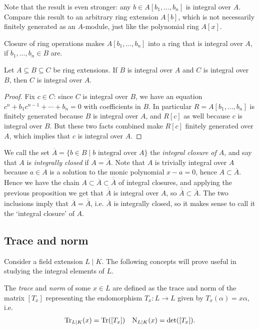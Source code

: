 Note that the result is even stronger: any $b\in A[b_1,\dots,b_n]$ is integral over $A$. Compare this result to an arbitrary ring extension $A[b]$, which is not necessarily finitely generated as an $A$-module, just like the polynomial ring $A[x]$.

Closure of ring operations makes $A[b_1,\dots,b_n]$ into a ring that is integral over $A$, if $b_1,\dots,b_n\in B$ are.

\begin{proposition}
	Let $A\subseteq B\subseteq C$ be ring extensions. If $B$ is integral over $A$ and $C$ is integral over $B$, then $C$ is integral over $A$.
\end{proposition}
\begin{proof}
	Fix $c\in C$: since $C$ is integral over $B$, we have an equation $c^n+b_1c^{n-1}+\cdots+b_n=0$ with coefficients in $B$. In particular $R=A[b_1,\dots,b_n]$ is finitely generated because $B$ is integral over $A$, and $R[c]$ as well because $c$ is integral over $B$. But these two facts combined make $R[c]$ finitely generated over $A$, which implies that $c$ is integral over $A$.
\end{proof}

We call the set $\overline{A}=\{b\in B \mid b \text{ integral over } A\}$ the \emph{integral closure of $A$}, and say that $A$ is \emph{integrally closed} if $A=\overline{A}$. Note that $A$ is trivially integral over $A$ because $a\in A$ is a solution to the monic polynomial $x-a=0$, hence $A\subset\overline{A}$. Hence we have the chain $A\subset \overline{A}\subset\overline{\overline{A}}$ of integral closures, and applying the previous proposition we get that $\overline{\overline{A}}$ is integral over $A$, so $\overline{\overline{A}}\subset\overline{A}$. The two inclusions imply that $\overline{A}=\overline{\overline{A}}$, i.e. $\overline{A}$ is integrally closed, so it makes sense to call it the `integral closure' of $A$.


\subsection{Trace and norm}

Consider a field extension $L\mid K$. The following concepts will prove useful in studying the integral elements of $L$.

\begin{definition}
	The \emph{trace} and \emph{norm} of some $x\in L$ are defined as the trace and norm of the matrix $[T_x]$ representing the endomorphism $T_x:L\to L$ given by $T_x(\alpha)=x\alpha$, i.e.
	\begin{align*}
		\operatorname{Tr}_{L\mid K}(x) = \operatorname{Tr}([T_x]) & & \operatorname{N}_{L\mid K}(x) = \det([T_x]).
	\end{align*}
\end{definition}

